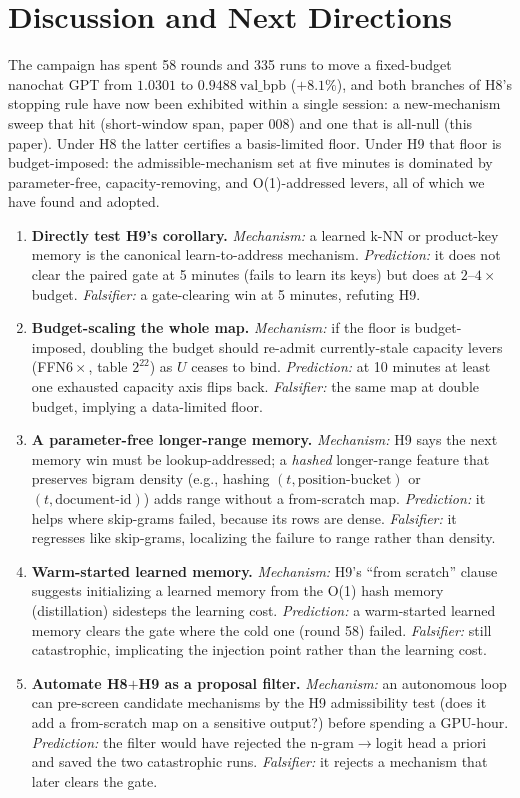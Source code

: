 \documentclass{article}
\newcommand{\valbpb}{\mathrm{val\_bpb}}
\begin{document}
\section{Discussion and Next Directions}
\label{sec:discussion}

The campaign has spent 58 rounds and 335 runs to move a fixed-budget nanochat GPT from $1.0301$ to $0.9488\ \valbpb$ ($+8.1\%$), and both branches of H8's stopping rule have now been exhibited within a single session: a new-mechanism sweep that hit (short-window span, paper 008) and one that is all-null (this paper). Under H8 the latter certifies a basis-limited floor. Under H9 that floor is budget-imposed: the admissible-mechanism set at five minutes is dominated by parameter-free, capacity-removing, and O(1)-addressed levers, all of which we have found and adopted.

\begin{enumerate}
    \item \textbf{Directly test H9's corollary.} \emph{Mechanism:} a learned k-NN or product-key memory \cite{lample2019pkm} is the canonical learn-to-address mechanism. \emph{Prediction:} it does not clear the paired gate at 5 minutes (fails to learn its keys) but does at $2$--$4\times$ budget. \emph{Falsifier:} a gate-clearing win at 5 minutes, refuting H9.
    \item \textbf{Budget-scaling the whole map.} \emph{Mechanism:} if the floor is budget-imposed, doubling the budget should re-admit currently-stale capacity levers (FFN$6\times$, table $2^{22}$) as $U$ ceases to bind. \emph{Prediction:} at 10 minutes at least one exhausted capacity axis flips back. \emph{Falsifier:} the same map at double budget, implying a data-limited floor.
    \item \textbf{A parameter-free longer-range memory.} \emph{Mechanism:} H9 says the next memory win must be lookup-addressed; a \emph{hashed} longer-range feature that preserves bigram density (e.g., hashing $(t,\text{position-bucket})$ or $(t,\text{document-id})$) adds range without a from-scratch map. \emph{Prediction:} it helps where skip-grams failed, because its rows are dense. \emph{Falsifier:} it regresses like skip-grams, localizing the failure to range rather than density.
    \item \textbf{Warm-started learned memory.} \emph{Mechanism:} H9's ``from scratch'' clause suggests initializing a learned memory from the O(1) hash memory (distillation) sidesteps the learning cost. \emph{Prediction:} a warm-started learned memory clears the gate where the cold one (round 58) failed. \emph{Falsifier:} still catastrophic, implicating the injection point rather than the learning cost.
    \item \textbf{Automate H8$+$H9 as a proposal filter.} \emph{Mechanism:} an autonomous loop can pre-screen candidate mechanisms by the H9 admissibility test (does it add a from-scratch map on a sensitive output?) before spending a GPU-hour. \emph{Prediction:} the filter would have rejected the n-gram$\to$logit head a priori and saved the two catastrophic runs. \emph{Falsifier:} it rejects a mechanism that later clears the gate.
\end{enumerate}
\end{document}

